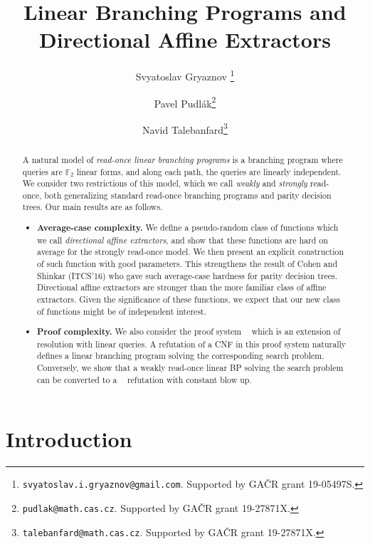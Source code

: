 \documentclass[a4paper,11pt,draft]{article}
\title{Linear Branching Programs and Directional Affine Extractors}
\author[1]{Svyatoslav Gryaznov \footnote{{\tt svyatoslav.i.gryaznov@gmail.com}. Supported by GA{\v C}R grant 19-05497S.}}
\author[2]{Pavel Pudl\'{a}k\footnote{{\tt pudlak@math.cas.cz}. Supported by GA{\v C}R grant 19-27871X.}}
\author[2]{Navid Talebanfard\footnote{{\tt talebanfard@math.cas.cz}. Supported by GA{\v C}R grant 19-27871X.}}
\affil[1]{St. Petersburg Department of V. A. Steklov Institute of Mathematics of the Russian Academy of Sciences}
\affil[2]{Institute of Mathematics, Czech Academy of Sciences}
\date{}
\theoremstyle{definition}
\theoremstyle{remark}
\DeclareMathOperator{\reslin}{\mathsf{Res}[\oplus]}
\newcommand{\bbF}{\mathbb{F}}
\newcommand{\sreadonce}{strongly read-once}
\newcommand{\wreadonce}{weakly read-once}
\newcommand{\readonce}{read-once}
\begin{document}
\maketitle




\begin{abstract}

A natural model of \emph{\readonce{} linear branching programs} is a branching program where queries are $\bbF_2$ linear forms, and along each path, the queries are linearly independent. We consider two restrictions of this model, which we call \emph{weakly} and \emph{strongly} read-once, both generalizing standard read-once branching programs and parity decision trees. Our main results are as follows.

\begin{itemize}
    \item {\bf Average-case complexity.} We define a pseudo-random class of functions which we call \emph{directional affine extractors}, and show that these functions are hard on average for the \sreadonce{} model. We then present an explicit construction of such function with good parameters. This strengthens the result of Cohen and Shinkar (ITCS'16) who gave such average-case hardness for parity decision trees. Directional affine extractors are stronger than the more familiar class of affine extractors. Given the significance of these functions, we expect that our new class of functions might be of independent interest.

    \item {\bf Proof complexity.} We also consider the proof system $\reslin$ which is an extension of resolution with linear queries. A refutation of a CNF in this proof system naturally defines a linear branching program solving the corresponding search problem. Conversely, we show that a \wreadonce{} linear BP solving the search problem can be converted to a $\reslin$ refutation with constant blow up.
\end{itemize}



\end{abstract}


%
\section{Introduction}
\end{document}
